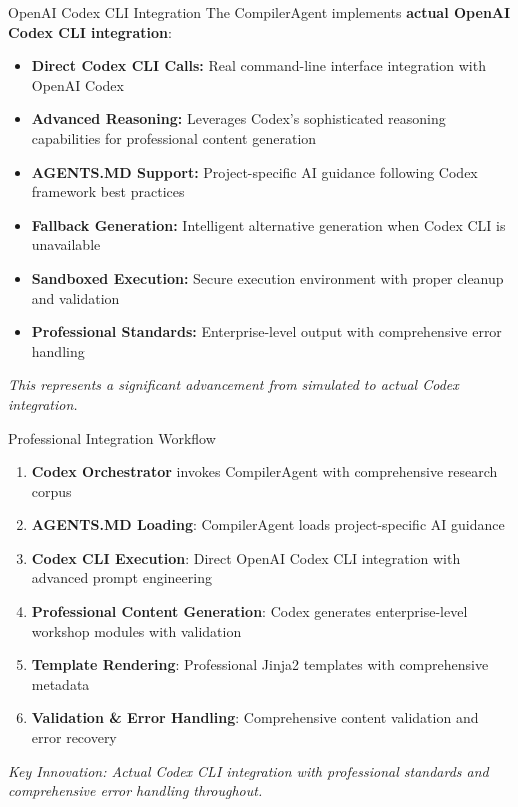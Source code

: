 \documentclass{beamer}
\begin{document}
\begin{frame}{OpenAI Codex CLI Integration}
    The CompilerAgent implements \textbf{actual OpenAI Codex CLI integration}:
    \begin{itemize}
        \item \textbf{Direct Codex CLI Calls:} Real command-line interface integration with OpenAI Codex
        \item \textbf{Advanced Reasoning:} Leverages Codex's sophisticated reasoning capabilities for professional content generation
        \item \textbf{AGENTS.MD Support:} Project-specific AI guidance following Codex framework best practices
        \item \textbf{Fallback Generation:} Intelligent alternative generation when Codex CLI is unavailable
        \item \textbf{Sandboxed Execution:} Secure execution environment with proper cleanup and validation
        \item \textbf{Professional Standards:} Enterprise-level output with comprehensive error handling
    \end{itemize}
    \textit{This represents a significant advancement from simulated to actual Codex integration.}
\end{frame}

\begin{frame}{Professional Integration Workflow}
    \begin{enumerate}
        \item \textbf{Codex Orchestrator} invokes CompilerAgent with comprehensive research corpus
        \item \textbf{AGENTS.MD Loading}: CompilerAgent loads project-specific AI guidance
        \item \textbf{Codex CLI Execution}: Direct OpenAI Codex CLI integration with advanced prompt engineering
        \item \textbf{Professional Content Generation}: Codex generates enterprise-level workshop modules with validation
        \item \textbf{Template Rendering}: Professional Jinja2 templates with comprehensive metadata
        \item \textbf{Validation \& Error Handling}: Comprehensive content validation and error recovery
    \end{enumerate}
    \textit{Key Innovation: Actual Codex CLI integration with professional standards and comprehensive error handling throughout.}
\end{frame}
\end{document}

